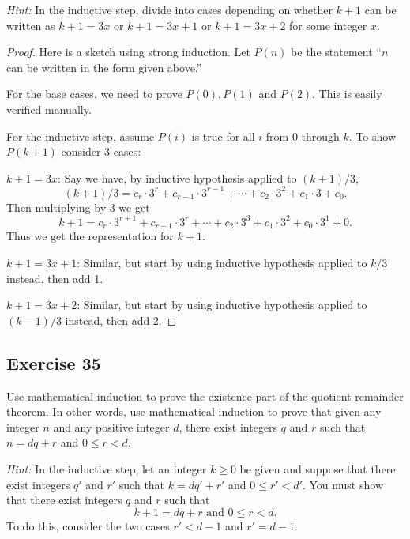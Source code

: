 \documentclass[14pt]{extarticle}
\begin{document}
{\it Hint:} In the inductive step, divide into cases depending on whether $k+1$ can be written as $k+1 = 3x$ or 
$k+1 = 3x + 1$ or $k+1 = 3x + 2$ for some integer $x$.

\begin{proof}
Here is a sketch using strong induction. Let $P(n)$ be the statement ``$n$ can be written in the form given above.''

For the base cases, we need to prove $P(0), P(1)$ and $P(2)$. This is easily verified manually.

For the inductive step, assume $P(i)$ is true for all $i$ from 0 through $k$. To show $P(k+1)$ consider 3 cases:

$k + 1 = 3x$: Say we have, by inductive hypothesis applied to $(k+1)/3$,
\[
(k + 1) / 3 = c_r \cdot 3^r + c_{r-1} \cdot 3^{r-1} + \cdots + c_2 \cdot 3^2 + c_1 \cdot 3 + c_0.
\]
Then multiplying by 3 we get
\[
k + 1 = c_r \cdot 3^{r+1} + c_{r-1} \cdot 3^{r} + \cdots + c_2 \cdot 3^3 + c_1 \cdot 3^2 + c_0 \cdot 3^1 + 0.
\]
Thus we get the representation for $k+1$.

$k + 1 = 3x+1$: Similar, but start by using inductive hypothesis applied to $k/3$ instead, then add 1.

$k + 1 = 3x+2$: Similar, but start by using inductive hypothesis applied to $(k-1)/3$ instead, then add 2.
\end{proof}

\subsection{Exercise 35}
Use mathematical induction to prove the existence part of the quotient-remainder theorem. In other words, use mathematical induction to prove that given any integer $n$ and any positive integer $d$, there exist integers $q$ and $r$ such that $n = dq + r$ and $0 \leq r < d$.

{\it Hint:} In the inductive step, let an integer $k \geq 0$ be given and suppose that there exist integers $q'$ and
$r'$ such that $k = dq' + r'$ and $0 \leq r' < d'.$ You must show that there exist integers $q$ and $r$ such that
\[
k + 1 = dq + r \text{ and } 0 \leq r < d.
\]
To do this, consider the two cases $r' < d - 1$ and $r' = d - 1$.
\end{document}

